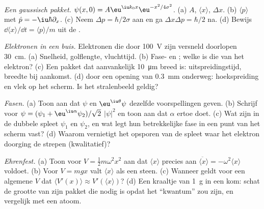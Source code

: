 \begin{exercise}[$\star\star$]\label{exo:b2:schrodinger-wave-functions:6}
\emph{Een gaussisch pakket.} $\psi(x,0) = A\eu^{\iu k_0x}\eu^{-x^2/4\sigma^2}$. (a)
$A$, $\langle x\rangle$, $\Delta x$. (b) $\langle p\rangle$ met
$\hat p =
-\iu\hbar\partial_x$. (c) Neem $\Delta p = \hbar/2\sigma$ aan en
ga
$\Delta x\Delta p = \hbar/2$ na. (d) Bewijs
$\dd\langle x\rangle/\dd t = \langle
p\rangle/m$ uit de
.
\end{exercise}

\begin{exercise}[$\star\star$]\label{exo:b2:schrodinger-wave-functions:7}
\emph{Elektronen in een buis.} Elektronen die door \qty{100}{V} zijn versneld
doorlopen \qty{30}{cm}. (a) Snelheid, golflengte, vluchttijd. (b) Fase- en
; welke is die van het elektron? (c) Een pakket dat aanvankelijk
\qty{10}{\micro m} breed is: uitspreidingstijd, breedte bij aankomst. (d) 
door een opening van \qty{0.3}{mm} onderweg: hoekspreiding en vlek op het
scherm. Is het stralenbeeld geldig?
\end{exercise}

\begin{exercise}[$\star\star$]\label{exo:b2:schrodinger-wave-functions:8}
\emph{Fasen.} (a) Toon aan dat $\psi$ en $\eu^{\iu\theta}\psi$ dezelfde
voorspellingen geven. (b) Schrijf voor
$\psi = (\psi_1 + \eu^{\iu\alpha}\psi_2)/\sqrt2$
$|\psi|^2$ en toon aan dat $\alpha$ ertoe doet. (c) Wat zijn in de dubbele spleet
$\psi_1$ en $\psi_2$, en wat legt hun betrekkelijke fase in een punt
van het scherm vast? (d) Waarom vernietigt het opsporen van de spleet waar
het elektron doorging
de strepen (kwalitatief)?
\end{exercise}

\begin{exercise}[$\star\star$]\label{exo:b2:schrodinger-wave-functions:9}
\emph{Ehrenfest.} (a) Toon voor $V = \tfrac12m\omega^2x^2$ aan dat
$\langle
x\rangle$ precies aan
$\ddot{\langle x\rangle} = -\omega^2\langle x\rangle$ voldoet.
(b) Voor $V = mgx$ valt $\langle x\rangle$ als een steen. (c) Wanneer geldt
voor een algemene
$V$ dat $\langle V'(x)\rangle \approx V'(\langle x\rangle)$? (d) Een
kraaltje van \qty{1}{g} in een kom: schat de grootte van zijn pakket die
nodig is opdat
het ``kwantum'' zou zijn, en vergelijk met een atoom.
\end{exercise}


